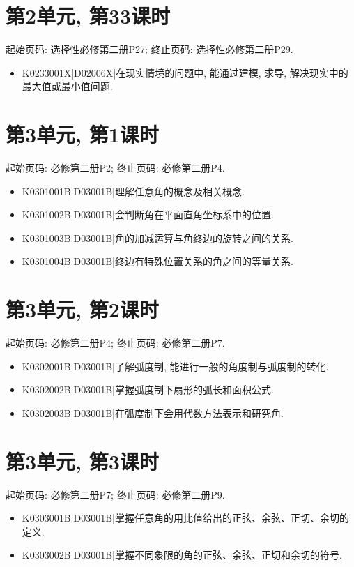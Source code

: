 \section*{第2单元, 第33课时}
起始页码: 选择性必修第二册P27; 终止页码: 选择性必修第二册P29.
\begin{itemize}
\item K0233001X|D02006X|在现实情境的问题中, 能通过建模, 求导, 解决现实中的最大值或最小值问题.
\end{itemize}

\section*{第3单元, 第1课时}
起始页码: 必修第二册P2; 终止页码: 必修第二册P4.
\begin{itemize}
\item K0301001B|D03001B|理解任意角的概念及相关概念.
\item K0301002B|D03001B|会判断角在平面直角坐标系中的位置.
\item K0301003B|D03001B|角的加减运算与角终边的旋转之间的关系.
\item K0301004B|D03001B|终边有特殊位置关系的角之间的等量关系.
\end{itemize}

\section*{第3单元, 第2课时}
起始页码: 必修第二册P4; 终止页码: 必修第二册P7.
\begin{itemize}
\item K0302001B|D03001B|了解弧度制, 能进行一般的角度制与弧度制的转化.
\item K0302002B|D03001B|掌握弧度制下扇形的弧长和面积公式.
\item K0302003B|D03001B|在弧度制下会用代数方法表示和研究角.
\end{itemize}

\section*{第3单元, 第3课时}
起始页码: 必修第二册P7; 终止页码: 必修第二册P9.
\begin{itemize}
\item K0303001B|D03001B|掌握任意角的用比值给出的正弦、余弦、正切、余切的定义.
\item K0303002B|D03001B|掌握不同象限的角的正弦、余弦、正切和余切的符号.
\end{itemize}

